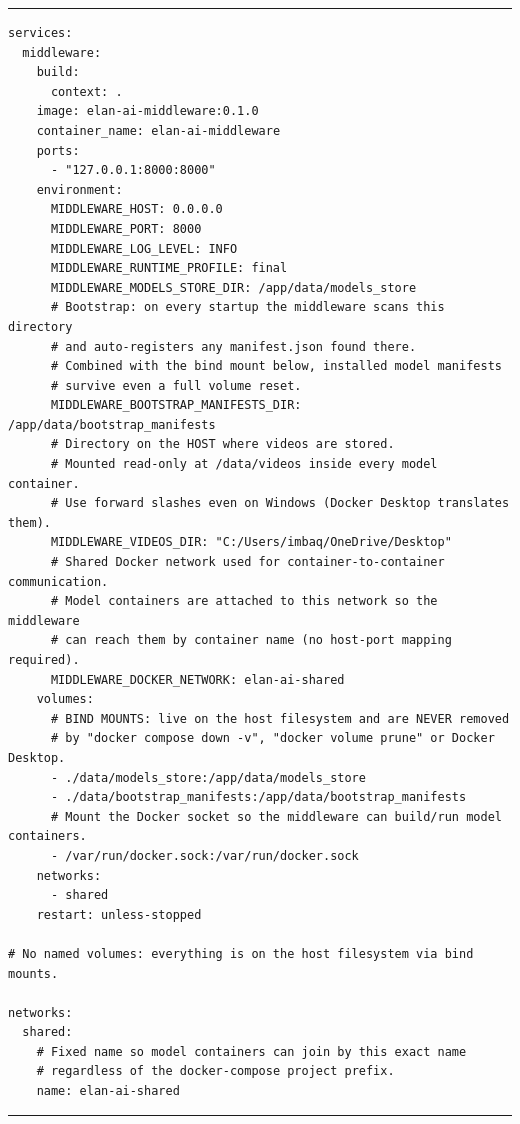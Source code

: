 \begin{center}
\begin{minipage}{0.96\textwidth}
\hrule
\vspace{0.06cm}
\scriptsize
\begin{Verbatim}[baselinestretch=0.68]
services:
  middleware:
    build:
      context: .
    image: elan-ai-middleware:0.1.0
    container_name: elan-ai-middleware
    ports:
      - "127.0.0.1:8000:8000"
    environment:
      MIDDLEWARE_HOST: 0.0.0.0
      MIDDLEWARE_PORT: 8000
      MIDDLEWARE_LOG_LEVEL: INFO
      MIDDLEWARE_RUNTIME_PROFILE: final
      MIDDLEWARE_MODELS_STORE_DIR: /app/data/models_store
      # Bootstrap: on every startup the middleware scans this directory
      # and auto-registers any manifest.json found there.
      # Combined with the bind mount below, installed model manifests
      # survive even a full volume reset.
      MIDDLEWARE_BOOTSTRAP_MANIFESTS_DIR: /app/data/bootstrap_manifests
      # Directory on the HOST where videos are stored.
      # Mounted read-only at /data/videos inside every model container.
      # Use forward slashes even on Windows (Docker Desktop translates them).
      MIDDLEWARE_VIDEOS_DIR: "C:/Users/imbaq/OneDrive/Desktop"
      # Shared Docker network used for container-to-container communication.
      # Model containers are attached to this network so the middleware
      # can reach them by container name (no host-port mapping required).
      MIDDLEWARE_DOCKER_NETWORK: elan-ai-shared
    volumes:
      # BIND MOUNTS: live on the host filesystem and are NEVER removed
      # by "docker compose down -v", "docker volume prune" or Docker Desktop.
      - ./data/models_store:/app/data/models_store
      - ./data/bootstrap_manifests:/app/data/bootstrap_manifests
      # Mount the Docker socket so the middleware can build/run model containers.
      - /var/run/docker.sock:/var/run/docker.sock
    networks:
      - shared
    restart: unless-stopped

# No named volumes: everything is on the host filesystem via bind mounts.

networks:
  shared:
    # Fixed name so model containers can join by this exact name
    # regardless of the docker-compose project prefix.
    name: elan-ai-shared
\end{Verbatim}
\vspace{0.03cm}
\hrule

\label{fig:docker_compose}
\end{minipage}
\end{center}

